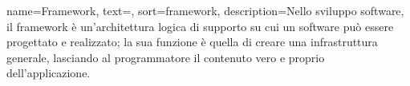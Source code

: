 {
    name=Framework,
    text=,
    sort=framework,
    description={Nello sviluppo software, il framework è un'architettura logica di supporto su cui un software può essere progettato e realizzato; la sua funzione è quella di creare una infrastruttura generale, lasciando al programmatore il contenuto vero e proprio dell'applicazione.}
}
